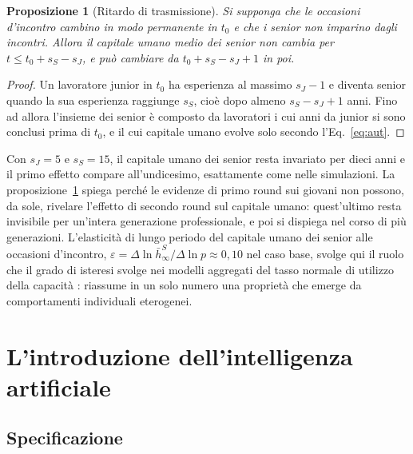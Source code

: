 \documentclass[preprint,12pt,authoryear]{elsarticle}
\newtheorem{proposition}{Proposizione}
\begin{document}
\begin{proposition}[Ritardo di trasmissione]\label{prop:lag}
Si supponga che le occasioni d'incontro cambino in modo permanente in $t_0$ e che i senior non imparino dagli incontri. Allora il capitale umano medio dei senior non cambia per $t \le t_0 + s_S - s_J$, e può cambiare da $t_0 + s_S - s_J + 1$ in poi.
\end{proposition}
\begin{proof}
Un lavoratore junior in $t_0$ ha esperienza al massimo $s_J-1$ e diventa senior quando la sua esperienza raggiunge $s_S$, cioè dopo almeno $s_S-s_J+1$ anni. Fino ad allora l'insieme dei senior è composto da lavoratori i cui anni da junior si sono conclusi prima di $t_0$, e il cui capitale umano evolve solo secondo l'Eq.~\eqref{eq:aut}.
\end{proof}

Con $s_J=5$ e $s_S=15$, il capitale umano dei senior resta invariato per dieci anni e il primo effetto compare all'undicesimo, esattamente come nelle simulazioni. La proposizione~\ref{prop:lag} spiega perché le evidenze di primo round sui giovani \citep{Brynjolfsson2025} non possono, da sole, rivelare l'effetto di secondo round sul capitale umano: quest'ultimo resta invisibile per un'intera generazione professionale, e poi si dispiega nel corso di più generazioni. L'elasticità di lungo periodo del capitale umano dei senior alle occasioni d'incontro, $\varepsilon = \Delta \ln \bar h^S_\infty / \Delta\ln p \approx 0{,}10$ nel caso base, svolge qui il ruolo che il grado di isteresi svolge nei modelli aggregati del tasso normale di utilizzo della capacità \citep{Bassi2022}: riassume in un solo numero una proprietà che emerge da comportamenti individuali eterogenei.

\section{L'introduzione dell'intelligenza artificiale}\label{sec:ai}

\subsection{Specificazione}
\end{document}
